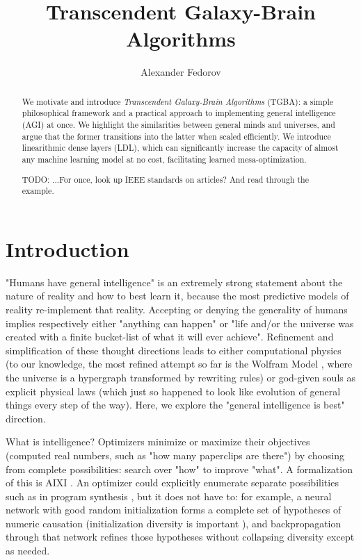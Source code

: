 \documentclass{article}
\begin{document}
\title{Transcendent Galaxy-Brain Algorithms}
\author{Alexander Fedorov}
\date{}

\maketitle

\begin{abstract}

We motivate and introduce \textit{Transcendent Galaxy-Brain Algorithms} (TGBA): a simple philosophical framework and a practical approach to implementing general intelligence (AGI) at once. We highlight the similarities between general minds and universes, and argue that the former transitions into the latter when scaled efficiently. We introduce linearithmic dense layers (LDL), which can significantly increase the capacity of almost any machine learning model at no cost, facilitating learned mesa-optimization.

    TODO: ...For once, look up IEEE standards on articles? And read through the example.

\end{abstract}

\section{Introduction}

"Humans have general intelligence" is an extremely strong statement about the nature of reality and how to best learn it, because the most predictive models of reality re-implement that reality. Accepting or denying the generality of humans implies respectively either "anything can happen" or "life and/or the universe was created with a finite bucket-list of what it will ever achieve". Refinement and simplification of these thought directions leads to either computational physics (to our knowledge, the most refined attempt so far is the Wolfram Model \cite{Wolfram_2020}, where the universe is a hypergraph transformed by rewriting rules) or god-given souls as explicit physical laws (which just so happened to look like evolution of general things every step of the way). Here, we explore the "general intelligence is best" direction.

What is intelligence? Optimizers minimize or maximize their objectives (computed real numbers, such as "how many paperclips are there") by choosing from complete possibilities: search over "how" to improve "what". A formalization of this is AIXI \cite{DBLP:journals/corr/cs-AI-0004001}. An optimizer could explicitly enumerate separate possibilities such as in program synthesis \cite{ellis2020dreamcoder}, but it does not have to: for example, a neural network with good random initialization forms a complete set of hypotheses of numeric causation (initialization diversity is important \cite{mellor2021neural}), and backpropagation through that network refines those hypotheses without collapsing diversity except as needed.
\end{document}
